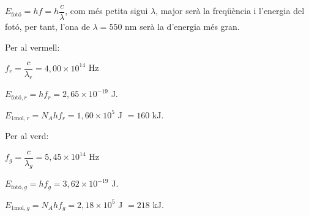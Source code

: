 \begin{solapartat}
 $E_{\text{fotó}} = hf = h\dfrac{c}{\lambda}$, com més petita sigui $\lambda$,
major serà la freqüència i l'energia del fotó, per tant, l'ona de $\lambda = 550$ nm serà
la d'energia més gran.

Per al vermell:

 $f_r = \dfrac{c}{\lambda_r} = 4,00\times 10^{14}$ Hz

 $E_{\text{fotó},r} = hf_r = 2,65\times 10^{-19}$ J.

 $E_{1\mathrm{mol},r} = N_A hf_r = 1,60\times 10^{5}$ J $= 160$ kJ.

Per al verd:

 $f_g = \dfrac{c}{\lambda_g} = 5,45\times 10^{14}$ Hz

 $E_{\text{fotó},g} = hf_g = 3,62\times 10^{-19}$ J.

 $E_{1\mathrm{mol},g} = N_A hf_g = 2,18\times 10^{5}$ J $= 218$ kJ.
\end{solapartat}


